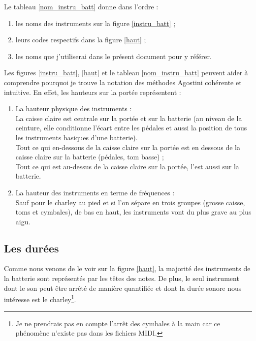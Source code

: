 Le tableau \ref{nom_instru_batt} donne dans l’ordre :
\begin{enumerate}
    \item les noms des instruments sur la figure \ref{instru_batt} ;
    \item leurs codes respectifs dans la figure \ref{haut} ;
    \item les noms que j’utiliserai dans le présent document pour y référer.
\end{enumerate}
Les figures \ref{instru_batt}, \ref{haut} et le tableau \ref{nom_instru_batt}
peuvent aider à comprendre pourquoi je trouve la notation des méthodes Agostini
cohérente et intuitive. En effet, les hauteurs sur la portée représentent :
\begin{enumerate}
	\item La hauteur physique des instruments :\\
	La caisse claire est centrale sur la portée et sur la batterie (au niveau
    de la ceinture, elle conditionne l’écart entre les pédales et aussi la
    position de tous les instruments basiques d’une batterie).\\
	Tout ce qui en-dessous de la caisse claire sur la portée est en dessous de
    la caisse claire sur la batterie (pédales, tom basse) ;\\
	Tout ce qui est au-dessus de la caisse claire sur la portée, l’est aussi
    sur la batterie.\\
	\item La hauteur des instruments en terme de fréquences :\\
	Sauf pour le charley au pied et si l’on sépare en trois groupes
    (grosse caisse, toms et cymbales), de bas en haut, les instruments vont du
    plus grave au plus aigu.
\end{enumerate}

\subsection*{Les durées}
\label{hho}
Comme nous venons de le voir sur la figure \ref{haut}, la majorité des
instruments de la batterie sont représentés par les têtes des notes. De plus, le seul instrument dont le son
peut être arrêté de manière quantifiée et dont la durée sonore nous intéresse
est le charley\footnote{Je ne prendrais pas en compte l’arrêt des cymbales à la
main car ce phénomène n’existe pas dans les fichiers MIDI.}.

